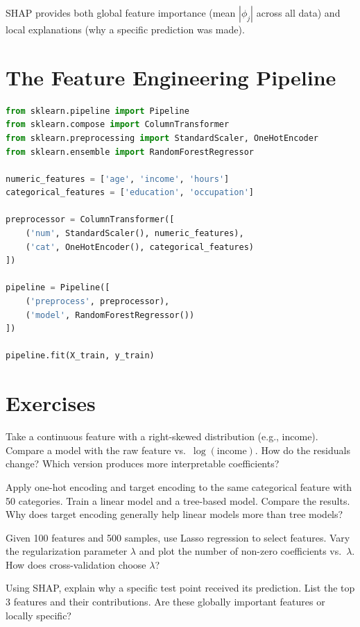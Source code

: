 SHAP provides both global feature importance (mean $|\phi_j|$ across all data) and local explanations (why a specific prediction was made).

\section{The Feature Engineering Pipeline}

\begin{lstlisting}[language=Python, caption=Feature engineering pipeline]
from sklearn.pipeline import Pipeline
from sklearn.compose import ColumnTransformer
from sklearn.preprocessing import StandardScaler, OneHotEncoder
from sklearn.ensemble import RandomForestRegressor

numeric_features = ['age', 'income', 'hours']
categorical_features = ['education', 'occupation']

preprocessor = ColumnTransformer([
    ('num', StandardScaler(), numeric_features),
    ('cat', OneHotEncoder(), categorical_features)
])

pipeline = Pipeline([
    ('preprocess', preprocessor),
    ('model', RandomForestRegressor())
])

pipeline.fit(X_train, y_train)
\end{lstlisting}

\section{Exercises}

\begin{exercise}
	Take a continuous feature with a right-skewed distribution (e.g., income). Compare a model with the raw feature vs.\ $\log(\text{income})$. How do the residuals change? Which version produces more interpretable coefficients?
\end{exercise}

\begin{exercise}
	Apply one-hot encoding and target encoding to the same categorical feature with 50 categories. Train a linear model and a tree-based model. Compare the results. Why does target encoding generally help linear models more than tree models?
\end{exercise}

\begin{exercise}
	Given 100 features and 500 samples, use Lasso regression to select features. Vary the regularization parameter $\lambda$ and plot the number of non-zero coefficients vs.\ $\lambda$. How does cross-validation choose $\lambda$?
\end{exercise}

\begin{exercise}
	Using SHAP, explain why a specific test point received its prediction. List the top 3 features and their contributions. Are these globally important features or locally specific?
\end{exercise}

